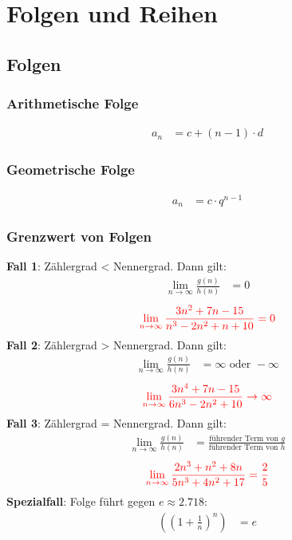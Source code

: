 \section{Folgen und Reihen}
\subsection{Folgen}
\subsubsection{Arithmetische Folge}
\begin{align*}
	a_n & = c + (n-1) \cdot d
\end{align*}
\subsubsection{Geometrische Folge}
\begin{align*}
	a_n & = c \cdot q^{n-1}
\end{align*}
\subsubsection{Grenzwert von Folgen}
\textbf{Fall 1}: Zählergrad < Nennergrad. Dann gilt:
\begin{align*}
	\lim_{n \to \infty} \frac{g(n)}{h(n)} & = 0
\end{align*}
\begin{align*}
	\textcolor{red}{\lim_{n \to \infty} \frac{3n^2 + 7n - 15}{n^3 - 2n^2 + n + 10} = 0}
\end{align*}
\textbf{Fall 2}: Zählergrad > Nennergrad. Dann gilt:
\begin{align*}
	\lim_{n \to \infty} \frac{g(n)}{h(n)} & = \infty \text{ oder } -\infty
\end{align*}
\begin{align*}
	\textcolor{red}{\lim_{n \to \infty} \frac{3n^4 + 7n - 15}{6n^3 - 2n^2 + 10} \to \infty}
\end{align*}
\textbf{Fall 3}: Zählergrad = Nennergrad. Dann gilt:
\begin{align*}
	\lim_{n \to \infty} \frac{g(n)}{h(n)} & = \frac{\text{führender Term von } g}{\text{führender Term von } h}
\end{align*}
\begin{align*}
	\textcolor{red}{\lim_{n \to \infty} \frac{2n^3 + n^2 + 8n}{5n^3 + 4n^2 + 17} = \frac{2}{5}}
\end{align*}
\textbf{Spezialfall}: Folge führt gegen $e \approx 2.718$:
\begin{align*}
	((1+\frac{1}{n})^n) & = e
\end{align*}

